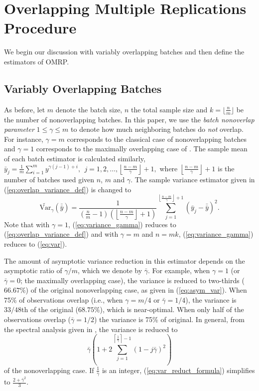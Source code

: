 \documentclass[12pt]{article}
\newcommand{\vartg}[1]{\widetilde{\mathrm{Var}}_\gamma \left( #1 \right)}
\newcommand{\nb}{\left\lfloor\tfrac{n-m}{\gamma}\right\rfloor+1}
\newcommand{\gammab}{\bar{\gamma}}
\newcommand{\ogb}{\tfrac{1}{\gammab}}
\newcommand{\cogb}{\left\lceil\ogb\right\rceil}
\newcommand{\yb}{\bar{y}}
\newcommand{\ybb}{\bar{\yb}}
\begin{document}
\section{Overlapping Multiple Replications Procedure} 
\label{sec:omrp}

We begin our discussion with variably overlapping batches and then define the estimators of OMRP.

\subsection{Variably Overlapping Batches} 
\label{ssec:overlap}

As before, let $m$ denote the batch size, $n$ the total sample size and $k = \lfloor \tfrac{n}{m} \rfloor$ be the number of nonoverlapping batches.  
In this paper, we use the {\it batch nonoverlap parameter} $1 \leq \gamma \leq m$ to denote how much neighboring batches do {\it not} overlap.  
For instance, $\gamma = m$ corresponds to the classical case of nonoverlapping batches and $\gamma = 1$ corresponds to the maximally overlapping case of \citet{Meketon1984}.  
The sample mean of each batch estimator is calculated similarly, 
$
\yb_j = \frac{1}{m} \sum_{i=1}^m y^{\gamma(j-1) + i},\ \  j = 1, 2, \dots, \nb, 
$
where $\nb$ is the number of batches used given $n$, $m$ and $\gamma$.  
The sample variance estimator given in (\ref{eq:overlap_variance_def}) is changed to
\begin{equation} \label{eq:variance_gamma}
	\vartg{\ybb} = \frac{1}{\left( \tfrac{n}{m} - 1 \right) \left( \nb \right)}  \sum_{j=1}^{\nb} (\yb_j - \ybb)^2.
\end{equation}
Note that with $\gamma=1$, (\ref{eq:variance_gamma}) reduces to (\ref{eq:overlap_variance_def}) and with $\gamma=m$ and $n=mk$, (\ref{eq:variance_gamma}) reduces to (\ref{eq:var}).

The amount of asymptotic variance reduction in this estimator depends on the asymptotic ratio of $\gamma/m$, which we denote by $\gammab$.  
For example, when $\gamma = 1$ (or $\gammab=0$; the maximally overlapping case), the variance is reduced to two-thirds ($66.67\%$) of the original nonoverlapping case, as given in (\ref{eq:asym_var}).  
When 75\% of observations overlap (i.e., when $\gamma = m/4$ or $\gammab = 1/4$), the variance is $33/48$th of the original ($68.75\%$), which is near-optimal.   
When only half of the observations overlap ($\gammab = 1/2$) the variance is 75\% of original.  
In general, from the spectral analysis given in \citep{Welch1987}, the variance is reduced to
\begin{equation} \label{eq:var_reduct_formula}
	\gammab \left( 1 + 2 \sum_{j=1}^{\cogb-1} (1-j\gammab)^2 \right) %
\end{equation}
of the nonoverlapping case.  
If $\ogb$ is an integer, (\ref{eq:var_reduct_formula}) simplifies to $\frac{2+\gammab^2}{3}$.
\end{document}
